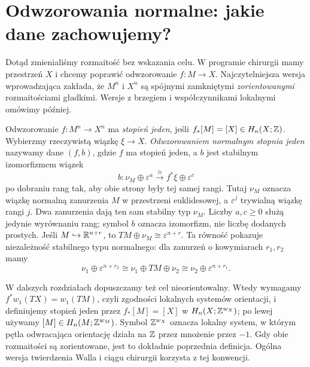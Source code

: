 \section{Odwzorowania normalne: jakie dane zachowujemy?}
\label{sec:normalne-chirurgia-21}

Dotąd zmienialiśmy rozmaitość bez wskazania celu.
W programie chirurgii mamy przestrzeń $X$ i chcemy
poprawić odwzorowanie $f:M\to X$. Najczytelniejsza
wersja wprowadzająca zakłada, że $M^n$ i $X^n$
są spójnymi zamkniętymi \emph{zorientowanymi}
rozmaitościami gładkimi. Wersje z brzegiem
i współczynnikami lokalnymi omówimy później.

\begin{definicja}
\label{def:normal-map-21}
Odwzorowanie $f:M^n\to X^n$ ma \emph{stopień jeden},
jeśli $f_*[M]=[X]\in H_n(X;\mathbb{Z})$.
Wybierzmy rzeczywistą wiązkę $\xi\to X$.
\emph{Odwzorowaniem normalnym stopnia jeden}
nazywamy dane $(f,b)$, gdzie $f$ ma stopień jeden,
a $b$ jest stabilnym izomorfizmem wiązek
\begin{equation}\label{eq:normal-map-21}
 b:\nu_M\oplus\varepsilon^a
   \xrightarrow{\ \cong\ }
   f^*\xi\oplus\varepsilon^c
\end{equation}
po dobraniu rang tak, aby obie strony były tej samej
rangi. Tutaj $\nu_M$ oznacza wiązkę normalną
zanurzenia $M$ w przestrzeni euklidesowej,
a $\varepsilon^j$ trywialną wiązkę rangi $j$.
Dwa zanurzenia dają ten sam stabilny typ $\nu_M$.
Liczby $a,c\geq0$ służą jedynie wyrównaniu rang;
symbol $b$ oznacza izomorfizm, nie liczbę dodanych prostych.
Jeśli $M\hookrightarrow\mathbb{R}^{n+r}$, to
$TM\oplus\nu_M\cong\varepsilon^{n+r}$.
Ta równość pokazuje niezależność stabilnego typu normalnego:
dla zanurzeń o kowymiarach $r_1,r_2$ mamy
\[
 \nu_1\oplus\varepsilon^{n+r_2}
 \cong\nu_1\oplus TM\oplus\nu_2
 \cong\nu_2\oplus\varepsilon^{n+r_1}.
\]
\end{definicja}

W dalszych rozdziałach dopuszczamy też cel
nieorientowalny. Wtedy wymagamy
$f^*w_1(TX)=w_1(TM)$, czyli zgodności
lokalnych systemów orientacji, i definiujemy
stopień jeden przez
$f_*[M]=[X]$ w
$H_n(X;\mathbb{Z}^{w_X})$; po lewej używamy
$[M]\in H_n(M;\mathbb{Z}^{w_M})$.
Symbol $\mathbb{Z}^{w_X}$ oznacza lokalny system,
w którym pętla odwracająca orientację
działa na $\mathbb{Z}$ przez mnożenie przez $-1$.
Gdy obie rozmaitości są zorientowane,
jest to dokładnie poprzednia definicja.
Ogólna wersja twierdzenia Walla i ciągu
chirurgii korzysta z tej konwencji.


